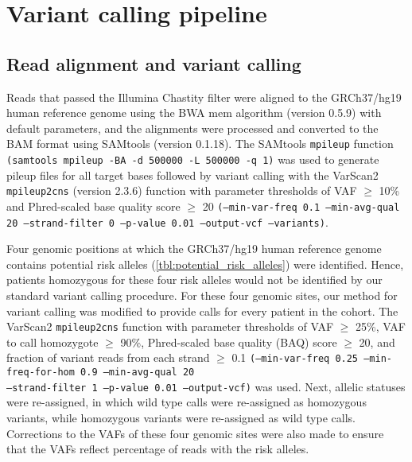 \section{Variant calling pipeline}
\label{sec:Variantcallingpipeline}

\subsection{Read alignment and variant calling}

Reads that passed the Illumina Chastity filter were aligned to the GRCh37/hg19 human reference genome using the BWA mem algorithm (version 0.5.9) with default parameters, and the alignments were processed and converted to the BAM format using SAMtools (version 0.1.18). The SAMtools \texttt{mpileup} function \texttt{(samtools mpileup -BA -d 500000 -L 500000 -q 1)} was used to generate pileup files for all target bases followed by variant calling with the VarScan2 \texttt{mpileup2cns} (version 2.3.6) function with parameter thresholds of VAF $\geq$ 10\% and Phred-scaled base quality score $\geq$ 20 \texttt{(--min-var-freq 0.1 --min-avg-qual 20 --strand-filter 0 --p-value 0.01 --output-vcf --variants)}.

Four genomic positions at which the GRCh37/hg19 human reference genome contains potential risk alleles (\autoref{tbl:potential_risk_alleles}) were identified. Hence, patients homozygous for these four risk alleles would not be identified by our standard variant calling procedure. For these four genomic sites, our method for variant calling was modified to provide calls for every patient in the cohort. The VarScan2 \texttt{mpileup2cns} function with parameter thresholds of VAF $\geq$ 25\%, VAF to call homozygote $\geq$ 90\%, Phred-scaled base quality (BAQ) score $\geq$ 20, and fraction of variant reads from each strand $\geq$ 0.1 \texttt{(--min-var-freq 0.25 --min-freq-for-hom 0.9 --min-avg-qual 20 \\\mbox{--strand-filter 1} --p-value 0.01 --output-vcf)} was used. Next, allelic statuses were re-assigned, in which wild type calls were re-assigned as homozygous variants, while homozygous variants were re-assigned as wild type calls. Corrections to the VAFs of these four genomic sites were also made to ensure that the VAFs reflect percentage of reads with the risk alleles.



